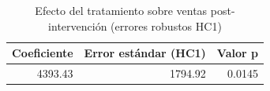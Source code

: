 
\begin{longtable}[t]{rrr}
\caption{Efecto del tratamiento sobre ventas post-intervención (errores robustos HC1)}\\
\toprule
Coeficiente & Error estándar (HC1) & Valor p\\
\midrule
4393.43 & 1794.92 & 0.0145\\
\bottomrule
\end{longtable}

